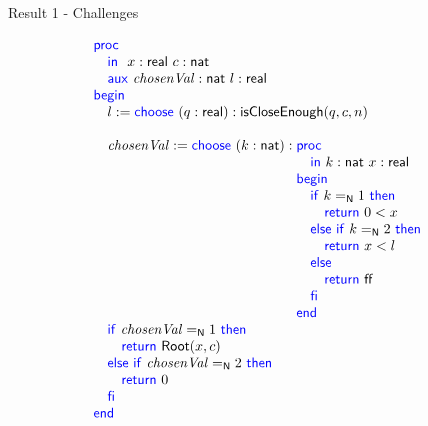 \begin{frame}{Result 1 - Challenges}
\begin{minipage}[t]{0.4\linewidth}
    \end{minipage}
    \begin{minipage}[t]{0.50\linewidth}
        \pause
        {
        \vspace{-1.5em}
        \center
        }
        \vspace{-1em}
        \scriptsize
         \[ 
            \BLOCK{             
                \PROC  \\
                    \INDENT{
                    \IN \ x:\real\ c:\nat \\
                    \AUX \chosenVal:\nat\ l:\real}\\
                \BEGIN \\
                    \INDENT{
                    l := \CHOOSE (q:\real) :
                                        \BLOCK{
                                        \isCloseEnough(q, c, n)} \\
                     \\
                    \chosenVal := \CHOOSE (k : \nat) :
                            \BLOCK{
                            \PROC \\
                                \INDENT{
                                \IN k:\nat\ x:\real}\\
                            \BEGIN \\
                                \INDENT{
                                \IF k \natEq 1 \THEN \\
                                    \INDENT{
                                    \RETURN 0<x}\\
                                \ELSE \IF k \natEq 2 \THEN \\
                                    \INDENT{
                                    \RETURN x<l}\\
                                \ELSE \\
                                    \INDENT{
                                    \RETURN \false}\\
                                \FI }\\
                            \END}\\
                    \IF \chosenVal \natEq 1 \THEN \\
                        \INDENT{
                        \RETURN \mathsf{Root}(x,c)}\\
                    \ELSE \IF \chosenVal \natEq 2 \THEN \\
                        \INDENT{
                        \RETURN 0}\\
                    \FI}\\
                \END}\\
            \] 
        \begin{flushright}
            \vspace{-8.5em}
            \pause
            
        \end{flushright}
        

\end{minipage}
\end{frame}
